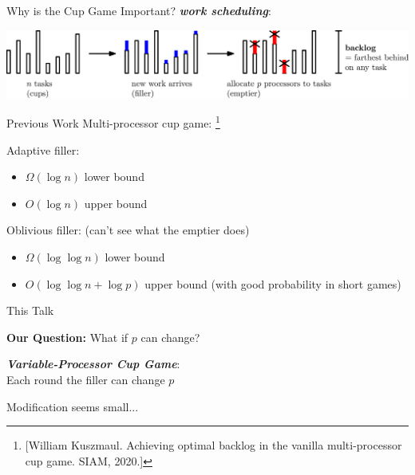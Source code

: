 \documentclass[xcolor=x11names, svgnames, rgb]{beamer}
\newcommand{\defn}[1]       {{\textit{\textbf{\boldmath #1}}}}
\begin{document}
\begin{frame}[t]{Why is the Cup Game Important?}
  \vspace{1cm}
  \defn{work scheduling}:
  \vspace{1cm}

  \includegraphics[width=\linewidth]{workScheduling/workScheduling.eps}
\end{frame}

\begin{frame}[t]{Previous Work}
  Multi-processor cup game: \footnote{[William Kuszmaul. Achieving optimal backlog in the vanilla multi-processor cup game. SIAM, 2020.]}

  Adaptive filler:
  \begin{itemize}
    \item $\Omega(\log n)$ lower bound
    \item $O(\log n)$ upper bound
  \end{itemize}

  Oblivious filler: (can't see what the emptier does)
  \begin{itemize}
    \item $\Omega(\log\log n)$ lower bound
    \item $O(\log\log n + \log p)$ upper bound (with good probability in short games)
  \end{itemize}
\end{frame}

\begin{frame}[t]{This Talk}

  \textbf{Our Question:} What if $p$ can change?
\vspace{1cm}

  \defn{Variable-Processor Cup Game}: \\
  Each round the filler can change $p$ 

\vspace{1cm}
Modification seems small...
\end{frame}
\end{document}
